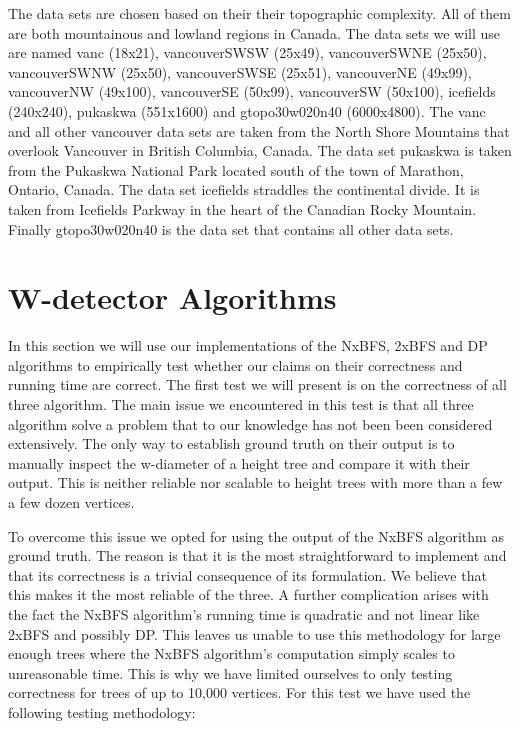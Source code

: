 The data sets are chosen based on their their topographic complexity. All of them are both mountainous and lowland regions in Canada. The data sets we will use are named vanc (18x21), vancouverSWSW (25x49), vancouverSWNE (25x50), vancouverSWNW (25x50), vancouverSWSE (25x51), vancouverNE (49x99), vancouverNW (49x100), vancouverSE (50x99), vancouverSW (50x100), icefields (240x240), pukaskwa (551x1600) and gtopo30w020n40 (6000x4800). The vanc and all other vancouver data sets are taken from the North Shore Mountains that overlook Vancouver in British Columbia, Canada. The data set pukaskwa is taken from the Pukaskwa National Park located south of the town of Marathon, Ontario, Canada. The data set icefields straddles the continental divide. It is taken from Icefields Parkway in the heart of the Canadian Rocky Mountain. Finally gtopo30w020n40 is the data set that contains all other data sets.

\section{W-detector Algorithms}

In this section we will use our implementations of the NxBFS, 2xBFS and DP algorithms to empirically test whether our claims on their correctness and running time are correct. The first test we will present is on the correctness of all three algorithm. The main issue we encountered in this test is that all three algorithm solve a problem that to our knowledge has not been been considered extensively. The only way to establish ground truth on their output is to manually inspect the w-diameter of a height tree and compare it with their output. This is neither reliable nor scalable to height trees with more than a few a few dozen vertices.

To overcome this issue we opted for using the output of the NxBFS algorithm as ground truth. The reason is that it is the most straightforward to implement and that its correctness is a trivial consequence of its formulation. We believe that this makes it the most reliable of the three. A further complication arises with the fact the NxBFS algorithm's running time is quadratic and not linear like 2xBFS and possibly DP. This leaves us unable to use this methodology for large enough trees where the NxBFS algorithm's computation simply scales to unreasonable time. This is why we have limited ourselves to only testing correctness for trees of up to 10,000 vertices. For this test we have used the following testing methodology:

